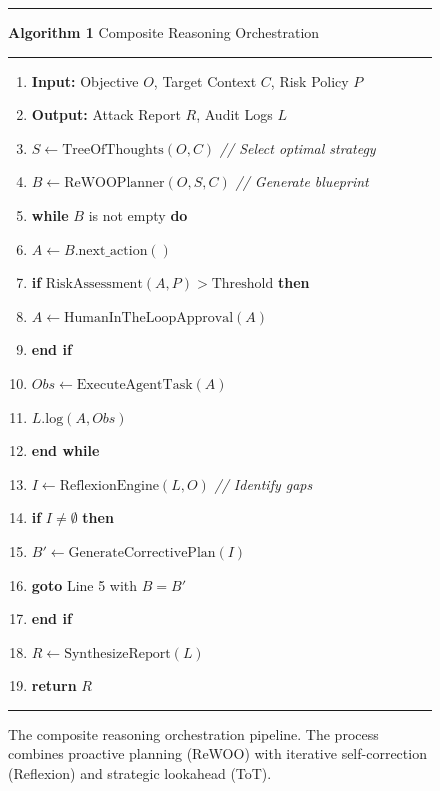 
\begin{figure}[htbp]
\centering
\begin{minipage}{0.48\textwidth}
\hrule
\vspace{2pt}
\textbf{Algorithm 1} Composite Reasoning Orchestration
\vspace{2pt}
\hrule
\vspace{5pt}
\small
\begin{enumerate}[label=\arabic*:, leftmargin=2em]
    \item \textbf{Input:} Objective $O$, Target Context $C$, Risk Policy $P$
    \item \textbf{Output:} Attack Report $R$, Audit Logs $L$
    \item $S \gets \text{TreeOfThoughts}(O, C)$ \hfill \textit{// Select optimal strategy}
    \item $B \gets \text{ReWOOPlanner}(O, S, C)$ \hfill \textit{// Generate blueprint}
    \item \textbf{while} $B$ is not empty \textbf{do}
    \item \quad $A \gets B.\text{next\_action}()$
    \item \quad \textbf{if} $\text{RiskAssessment}(A, P) > \text{Threshold}$ \textbf{then}
    \item \quad \quad $A \gets \text{HumanInTheLoopApproval}(A)$
    \item \quad \textbf{end if}
    \item \quad $Obs \gets \text{ExecuteAgentTask}(A)$
    \item \quad $L.\text{log}(A, Obs)$
    \item \textbf{end while}
    \item $I \gets \text{ReflexionEngine}(L, O)$ \hfill \textit{// Identify gaps}
    \item \textbf{if} $I \neq \emptyset$ \textbf{then}
    \item \quad $B' \gets \text{GenerateCorrectivePlan}(I)$
    \item \quad \textbf{goto} Line 5 with $B = B'$
    \item \textbf{end if}
    \item $R \gets \text{SynthesizeReport}(L)$
    \item \textbf{return} $R$
\end{enumerate}
\vspace{2pt}
\hrule
\end{minipage}
\caption{The composite reasoning orchestration pipeline. The process combines proactive planning (ReWOO) with iterative self-correction (Reflexion) and strategic lookahead (ToT).}
\label{alg:composite-reasoning}
\end{figure}
